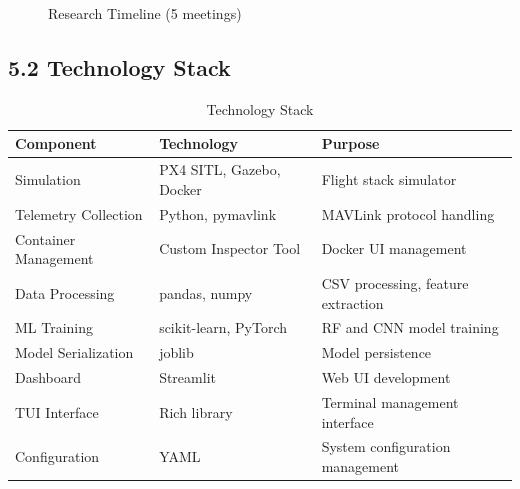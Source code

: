 \begin{figure}[htbp]
    \centering
    \caption{Research Timeline (5 meetings)}
    \label{fig:timeline}
\end{figure}

\subsection{5.2 Technology Stack}

\begin{table}[htbp]
    \centering
    \caption{Technology Stack}
    \label{tab:tech_stack}
    \begin{tabular}{|l|l|p{5cm}|}
        \hline
        \textbf{Component} & \textbf{Technology} & \textbf{Purpose} \\
        \hline
        Simulation & PX4 SITL, Gazebo, Docker & Flight stack simulator \\
        \hline
        Telemetry Collection & Python, pymavlink & MAVLink protocol handling \\
        \hline
        Container Management & Custom Inspector Tool & Docker UI management \\
        \hline
        Data Processing & pandas, numpy & CSV processing, feature extraction \\
        \hline
        ML Training & scikit-learn, PyTorch & RF and CNN model training \\
        \hline
        Model Serialization & joblib & Model persistence \\
        \hline
        Dashboard & Streamlit & Web UI development \\
        \hline
        TUI Interface & Rich library & Terminal management interface \\
        \hline
        Configuration & YAML & System configuration management \\
        \hline
\end{tabular}
\end{table}

